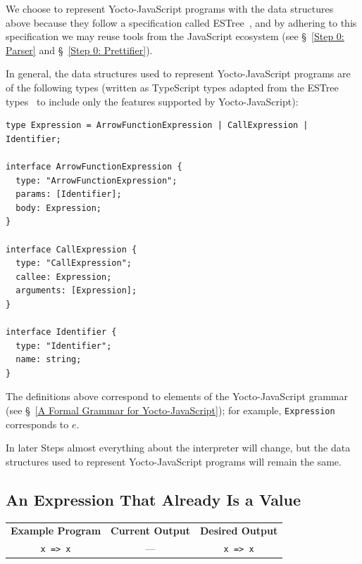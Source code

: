 \documentclass[12pt, oneside]{book}
\begin{document}
We choose to represent Yocto-JavaScript programs with the data structures above because they follow a specification called ESTree~\cite{estree}, and by adhering to this specification we may reuse tools from the JavaScript ecosystem (see §~\ref{Step 0: Parser} and §~\ref{Step 0: Prettifier}).

In general, the data structures used to represent Yocto-JavaScript programs are of the following types (written as TypeScript types adapted from the ESTree types~\cite{estree-types} to include only the features supported by Yocto-JavaScript):

\begin{verbatim}
type Expression = ArrowFunctionExpression | CallExpression | Identifier;

interface ArrowFunctionExpression {
  type: "ArrowFunctionExpression";
  params: [Identifier];
  body: Expression;
}

interface CallExpression {
  type: "CallExpression";
  callee: Expression;
  arguments: [Expression];
}

interface Identifier {
  type: "Identifier";
  name: string;
}
\end{verbatim}

\begin{mdframed}[frametitle = {Advanced}]
The definitions above correspond to elements of the Yocto-JavaScript grammar (see §~\ref{A Formal Grammar for Yocto-JavaScript}); for example, \texttt{Expression} corresponds to $e$.
\end{mdframed}

In later Steps almost everything about the interpreter will change, but the data structures used to represent Yocto-JavaScript programs will remain the same.

\subsection{An Expression That Already Is a Value}
\label{An Expression That Already Is a Value}

\begin{center}
\begin{tabular}{c|c|c}
\textbf{Example Program} & \textbf{Current Output} & \textbf{Desired Output} \\
\texttt{x => x} & — & \texttt{x => x} \\
\end{tabular}
\end{center}
\end{document}
